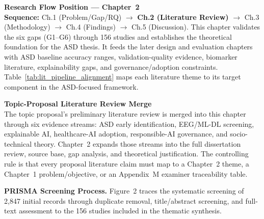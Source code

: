 \medskip\noindent
\small\textbf{Research Flow Position --- Chapter~2}\\[3pt]
\textbf{Sequence:} Ch.1 (Problem/Gap/RQ) $\to$ \textbf{Ch.2 (Literature Review)} $\to$ Ch.3 (Methodology) $\to$ Ch.4 (Findings) $\to$ Ch.5 (Discussion).
This chapter validates the six gaps (G1--G6) through 156 studies and establishes the theoretical foundation for the ASD thesis. It feeds the later design and evaluation chapters with ASD baseline accuracy ranges, validation-quality evidence, biomarker literature, explainability gaps, and governance/adoption constraints. Table~\ref{tab:lit_pipeline_alignment} maps each literature theme to its target component in the ASD-focused framework.

\medskip\noindent
\small\textbf{Topic-Proposal Literature Review Merge}\\[3pt]
The topic proposal's preliminary literature review is merged into this chapter through six evidence streams: ASD early identification, EEG/ML-DL screening, explainable AI, healthcare-AI adoption, responsible-AI governance, and socio-technical theory. Chapter~2 expands those streams into the full dissertation review, source base, gap analysis, and theoretical justification. The controlling rule is that every proposal literature claim must map to a Chapter~2 theme, a Chapter~1 problem/objective, or an Appendix~M examiner traceability table.

\vspace{0.5em}

\noindent\textbf{PRISMA Screening Process.} Figure~2 traces the systematic screening of 2,847 initial records through duplicate removal, title/abstract screening, and full-text assessment to the 156 studies included in the thematic synthesis.

